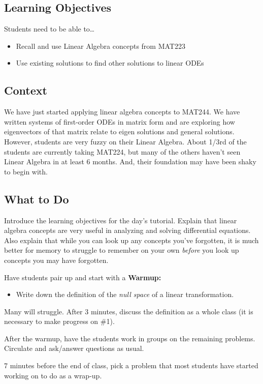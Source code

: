 \subsection*{Learning Objectives}
	Students need to be able to\ldots
	\begin{itemize}
		\item Recall and use Linear Algebra concepts from MAT223
		\item Use existing solutions to find other solutions to linear ODEs
	\end{itemize}

\subsection*{Context}
	We have just started applying linear algebra concepts to MAT244. We have written systems of first-order ODEs
	in matrix form and are exploring how eigenvectors of that matrix relate to eigen solutions and general solutions.
	However, students are very fuzzy on their Linear Algebra. About 1/3rd of the students are currently taking MAT224,
	but many of the others haven't seen Linear Algebra in at least 6 months. And, their foundation may have been shaky to begin with.

\subsection*{What to Do}
	Introduce the learning objectives for the day's tutorial. Explain that linear algebra concepts are
	very useful in analyzing and solving differential equations. Also explain that while you can look up
	any concepts you've forgotten, it is much better for memory to struggle to remember on your own \emph{before}
	you look up concepts you may have forgotten.

	Have students pair up and start with a \textbf{Warmup:}
	\begin{itemize}
		\item Write down the definition of the \emph{null space} of a linear transformation.
	\end{itemize}

		Many will struggle. After 3 minutes, discuss the definition as a whole class (it is necessary to make progress on \#1).

		After the warmup, have the students work in groups on the remaining problems. Circulate and ask/answer questions as usual.

		7 minutes before the end of class, pick a problem that most students have started working on
		to do as a wrap-up.


